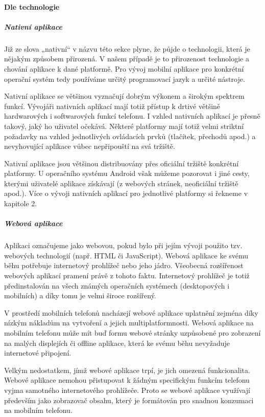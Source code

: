 \paragraph{Dle technologie}
\subparagraph{Nativní aplikace}
Již ze slova „nativní“ v názvu této sekce plyne, že půjde o technologii, která je nějakým způsobem přirozená. V našem případě je to přirozenost technologie a chování aplikace k dané platformě. Pro vývoj mobilní aplikace pro konkrétní operační systém tedy používáme určitý programovací jazyk a určité nástroje. 

Nativní aplikace se většinou vyznačují dobrým výkonem a širokým spektrem funkcí. Vývojáři nativních aplikací mají totiž přístup k drtivé většině hardwarových i softwarových funkcí telefonu. I vzhled nativních aplikací je přesně takový, jaký ho uživatel očekává. Některé platformy mají totiž velmi striktní požadavky na vzhled jednotlivých ovládacích prvků (tlačítek, přechodů apod.) a nevyhovující aplikace vůbec nepřipouští na svá tržiště.

Nativní aplikace jsou většinou distribuovány přes oficiální tržiště konkrétní platformy. U operačního systému Android však můžeme pozorovat i jiné cesty, kterými uživatelé aplikace získávají (z webových stránek, neoficiální tržiště apod.). Více o vývoji nativních aplikací pro jednotlivé platformy si řekneme v kapitole 2.

\subparagraph{Webová aplikace}
Aplikaci označujeme jako webovou, pokud bylo při jejím vývoji použito tzv. webových technologií (např. HTML či JavaScript). Webová aplikace ke svému běhu potřebuje internetový prohlížeč nebo jeho jádro. Všeobecná rozšířenost webových aplikací pramení právě z tohoto faktu. Internetový prohlížeč je totiž předinstalován na všech známých operačních systémech (desktopových i mobilních) a díky tomu je velmi široce rozšířený.

V prostředí mobilních telefonů nacházejí webové aplikace uplatnění zejména díky nízkým nákladům na vytvoření a jejich multiplatformnosti. Webová aplikace na mobilním telefonu může mít buď formu webové stránky uzpůsobené pro zobrazení na malých displejích či offline aplikace, která ke svému běhu nevyžaduje internetové připojení.

Velkým nedostatkem, jímž webové aplikace trpí, je jich omezená funkcionalita. Webové aplikace nemohou přistupovat k žádným specifickým funkcím telefonu vyjma samotného internetového prohlížeče. Proto se webové aplikace využívají především jako zobrazovač obsahu, který je formátován pro snadnou konzumaci na mobilním telefonu.

